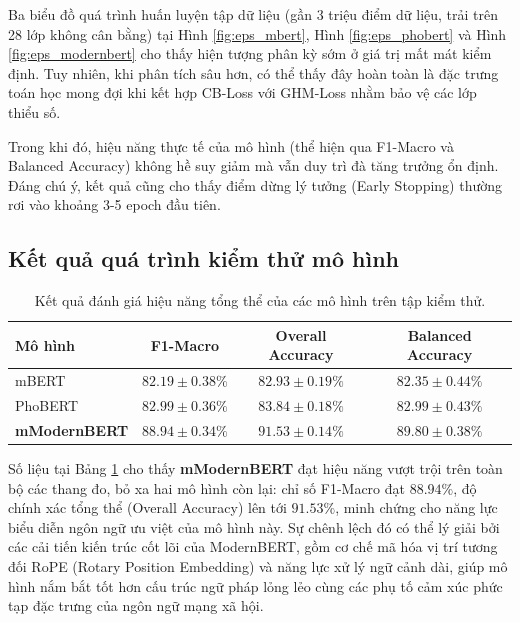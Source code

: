 Ba biểu đồ quá trình huấn luyện tập dữ liệu (gần 3 triệu điểm dữ liệu, trải trên 28 lớp không cân bằng) tại Hình \ref{fig:eps_mbert}, Hình \ref{fig:eps_phobert} và Hình \ref{fig:eps_modernbert} cho thấy hiện tượng phân kỳ sớm ở giá trị mất mát kiểm định. Tuy nhiên, khi phân tích sâu hơn, có thể thấy đây hoàn toàn là đặc trưng toán học mong đợi khi kết hợp CB-Loss với GHM-Loss nhằm bảo vệ các lớp thiểu số.

Trong khi đó, hiệu năng thực tế của mô hình (thể hiện qua F1-Macro và Balanced Accuracy) không hề suy giảm mà vẫn duy trì đà tăng trưởng ổn định. Đáng chú ý, kết quả cũng cho thấy điểm dừng lý tưởng (Early Stopping) thường rơi vào khoảng 3-5 epoch đầu tiên.


\subsection{Kết quả quá trình kiểm thử mô hình}

\begin{table}[H]
    \centering
    \renewcommand{\arraystretch}{1.3}
    \caption{Kết quả đánh giá hiệu năng tổng thể của các mô hình trên tập kiểm thử.}
    \label{tab:overall_results}
    \begin{tabular}{|l|c|c|c|}
        \hline
        \textbf{Mô hình} & \textbf{F1-Macro} & \textbf{Overall Accuracy} & \textbf{Balanced Accuracy} \\
        \hline
        mBERT & $82.19 \pm 0.38\%$ & $82.93 \pm 0.19\%$ & $82.35 \pm 0.44\%$ \\
        \hline
        PhoBERT & $82.99 \pm 0.36\%$ & $83.84 \pm 0.18\%$ & $82.99 \pm 0.43\%$ \\
        \hline
        \textbf{mModernBERT} & $\mathbf{88.94 \pm 0.34\%}$ & $\mathbf{91.53 \pm 0.14\%}$ & $\mathbf{89.80 \pm 0.38\%}$ \\
        \hline
    \end{tabular}
\end{table}

Số liệu tại Bảng \ref{tab:overall_results} cho thấy \textbf{mModernBERT} đạt hiệu năng vượt trội trên toàn bộ các thang đo, bỏ xa hai mô hình còn lại: chỉ số F1-Macro đạt $88.94\%$, độ chính xác tổng thể (Overall Accuracy) lên tới $91.53\%$, minh chứng cho năng lực biểu diễn ngôn ngữ ưu việt của mô hình này. Sự chênh lệch đó có thể lý giải bởi các cải tiến kiến trúc cốt lõi của ModernBERT, gồm cơ chế mã hóa vị trí tương đối RoPE (Rotary Position Embedding) và năng lực xử lý ngữ cảnh dài, giúp mô hình nắm bắt tốt hơn cấu trúc ngữ pháp lỏng lẻo cùng các phụ tố cảm xúc phức tạp đặc trưng của ngôn ngữ mạng xã hội.

